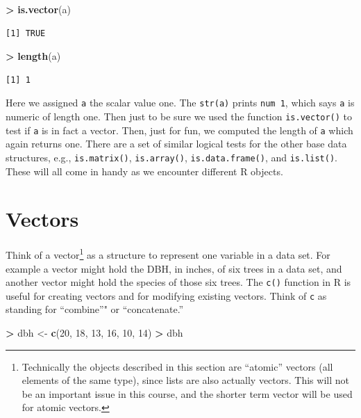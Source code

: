 \documentclass[]{krantz}
\makeatletter
\newenvironment{Shaded}{\begin{snugshade}}{\end{snugshade}}
\newcommand{\DecValTok}[1]{\textcolor[rgb]{0.06,0.06,0.06}{#1}}
\newcommand{\KeywordTok}[1]{\textcolor[rgb]{0.27,0.27,0.27}{\textbf{#1}}}
\newcommand{\NormalTok}[1]{#1}
\newcommand{\OperatorTok}[1]{\textcolor[rgb]{0.43,0.43,0.43}{\textbf{#1}}}
\newcommand{\StringTok}[1]{\textcolor[rgb]{0.5,0.5,0.5}{#1}}
\newenvironment{kframe}{%
\medskip{}
\setlength{\fboxsep}{.8em}
 \def\at@end@of@kframe{}%
 \ifinner\ifhmode%
  \def\at@end@of@kframe{\end{minipage}}%
  \begin{minipage}{\columnwidth}%
 \fi\fi%
 \def\FrameCommand##1{\hskip\@totalleftmargin \hskip-\fboxsep
 \colorbox{shadecolor}{##1}\hskip-\fboxsep
     \hskip-\linewidth \hskip-\@totalleftmargin \hskip\columnwidth}%
 \MakeFramed {\advance\hsize-\width
   \@totalleftmargin\z@ \linewidth\hsize
   \@setminipage}}%
 {\par\unskip\endMakeFramed%
 \at@end@of@kframe}
\renewenvironment{Shaded}{\begin{kframe}}{\end{kframe}}
\makeatother
\begin{document}
\begin{Shaded}
\begin{Highlighting}[]
\OperatorTok{>}\StringTok{ }\KeywordTok{is.vector}\NormalTok{(a)}
\end{Highlighting}
\end{Shaded}

\begin{verbatim}
[1] TRUE
\end{verbatim}

\begin{Shaded}
\begin{Highlighting}[]
\OperatorTok{>}\StringTok{ }\KeywordTok{length}\NormalTok{(a)}
\end{Highlighting}
\end{Shaded}

\begin{verbatim}
[1] 1
\end{verbatim}

Here we assigned \texttt{a} the scalar value one. The \texttt{str(a)} prints \texttt{num\ 1}, which says \texttt{a} is numeric of length one. Then just to be sure we used the function \texttt{is.vector()} to test if \texttt{a} is in fact a vector. Then, just for fun, we computed the length of \texttt{a} which again returns one. There are a set of similar logical tests for the other base data structures, e.g., \texttt{is.matrix()}, \texttt{is.array()}, \texttt{is.data.frame()}, and \texttt{is.list()}. These will all come in handy as we encounter different R objects.

\hypertarget{vectors}{%
\section{Vectors}\label{vectors}}

Think of a vector\footnote{Technically the objects described in this section are ``atomic'' vectors (all elements of the same type), since lists are also actually vectors. This will not be an important issue in this course, and the shorter term vector will be used for atomic vectors.} as a structure to represent one variable in a data set. For example a vector might hold the DBH, in inches, of six trees in a data set, and another vector might hold the species of those six trees. The \texttt{c()} function in R is useful for creating vectors and for modifying existing vectors. Think of \texttt{c} as standing for ``combine''" or ``concatenate.''

\begin{Shaded}
\begin{Highlighting}[]
\OperatorTok{>}\StringTok{ }\NormalTok{dbh <-}\StringTok{ }\KeywordTok{c}\NormalTok{(}\DecValTok{20}\NormalTok{, }\DecValTok{18}\NormalTok{, }\DecValTok{13}\NormalTok{, }\DecValTok{16}\NormalTok{, }\DecValTok{10}\NormalTok{, }\DecValTok{14}\NormalTok{)}
\OperatorTok{>}\StringTok{ }\NormalTok{dbh}
\end{Highlighting}
\end{Shaded}
\end{document}

